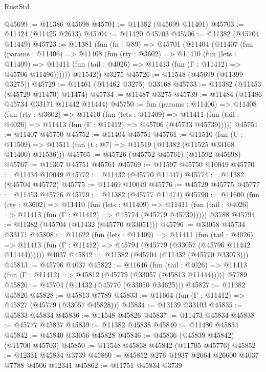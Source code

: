\begin{lexlean}{RustStd}
\begin{coremodule}
@45699 := @11386 @45698
@45701 := @11382 (@45699 @11401)
@45703 := @11424 (@11425 @2613)
@45704 := @11420 @45703
@45706 := @11382 (@45704 @11449)
@45723 := @11381
    (fun (fn : @89) =>
    @45701
      (@11404
        (@11407
          (fun (params : @11406) =>
          @11408
            (fun (rty : @3602) =>
            @11410
              (fun (lets : @11409) =>
              @11411 (fun (tail : @4026) => @11413 (fun (Γ : @11412) => @45706 @11496))))))
        @11542))
    @3275
@45726 := @11548 (@45699 (@11399 @3275))
@45729 := @11461 (@11462 @3275) @33168
@45733 := @11382 (@11453 (@45729 @11470) @11474)
@45734 := @11487 @3275
@45739 := @11484 (@11486 @45734 @33171 @11442 @11444)
@45750 := fun (params : @11406) =>
  @11408
    (fun (rty : @3602) =>
    @11410
      (fun (lets : @11409) =>
      @11411 (fun (tail : @4026) => @11413 (fun (Γ : @11412) => @45706 (@45733 @45739)))))
@45751 := @11407 @45750
@45752 := @11404 @45751
@45761 := @11510
    (fun (U : @11509) => @11511 (fun (t : @7) => @11519 (@11382 (@11525 @33168 @11400) @11536)))
@45765 := @45726 (@45752 @45761) (@11592 @45698)
@45767 := @11367 @45751 @45761
@45769 := @11597 @45750 @10049
@45770 := @11434 @10049
@45772 := @11432 (@45770 @11447)
@45774 := @11382 (@45704 @45772)
@45775 := @11469 @10049
@45776 := @45729 @45775
@45777 := @11453 @45776
@45779 := @11382 (@45777 @11474)
@45790 := @11600
    (fun (rty : @3602) =>
    @11410
      (fun (lets : @11409) =>
      @11411 (fun (tail : @4026) => @11413 (fun (Γ : @11412) => @45774 (@45779 @45739)))))
    @3788
@45794 := @11382 (@45704 (@11432 (@45770 @33051)))
@45796 := @33058 @45734 @33171
@45808 := @11622
    (fun (lets : @11409) =>
    @11411
      (fun (tail : @4026) =>
      @11413 (fun (Γ : @11412) => @45794 (@45779 (@33057 (@45796 @11442 @11444))))))
    @4037
@45812 := @11382 (@45704 (@11432 (@45770 @33073)))
@45813 := @45796 @4037
@45822 := @11646
    (fun (tail : @4026) => @11413 (fun (Γ : @11412) => @45812 (@45779 (@33057 (@45813 @11444)))))
    @7789
@45826 := @45704 (@11432 (@45770 (@33050 @34625)))
@45827 := @11382 @45826
@45828 := @45813 @7789
@45833 := @11664 (fun (Γ : @11412) => @45827 (@45779 (@33057 @45828)))
@45834 := @13139 @33103
@45835 := @45833 @45834
@45836 := @11548 @45826
@45837 := @11473 @45834
@45838 := @45777 @45837
@45839 := @11382 @45838
@45840 := @11480 @45834
@45842 := @45840 @33056 @45828
@45846 := @45836 (@45839 @45842) (@11700 @45703)
@45850 := @11548 @45838 @45842 (@11705 @45776)
@45852 := @12331 @45834 @3739
@45860 := @45852 @276 @1937 @2664 @26600 @4037 @7788 @4506 @12341
@45862 := @11751 @45834 @3739

\end{coremodule}
\end{lexlean}
